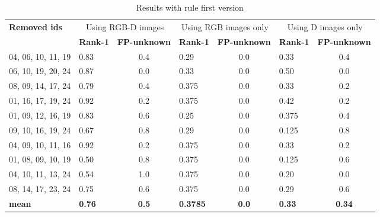 \documentclass{article}
\begin{document}
\begin{table}[]
	\begin{adjustwidth}{-.75in}{-.75in}
		\centering
		\caption{Results with rule first version}
		\label{tab:results-alpha}
		\begin{tabular}{|l|l|c|l|c|l|c|}
			\hline
			\multirow{2}{*}{\bf Removed ids} & \multicolumn{2}{c|}{Using RGB-D images} &\multicolumn{2}{c|}{Using RGB images only} &\multicolumn{2}{c|}{Using D images only} \\ \cline{2-7}
							 & \bf Rank-1 & \bf FP-unknown            & \bf Rank-1 & \bf FP-unknown              & \bf Rank-1 & \bf FP-unknown  \\ \hline
			04, 06, 10, 11, 19               & 0.83	      & 0.4                       & 0.29       & 0.0                         & 0.33       & 0.4\\ \hline
			06, 10, 19, 20, 24               & 0.87	      & 0.0                       & 0.33       & 0.0                         & 0.50       & 0.0\\ \hline
			08, 09, 14, 17, 24               & 0.79	      & 0.4                       & 0.375      & 0.0                         & 0.33       & 0.2\\ \hline
			01, 16, 17, 19, 24               & 0.92	      & 0.2                       & 0.375      & 0.0                         & 0.42       & 0.2\\ \hline
			01, 09, 12, 16, 19               & 0.83	      & 0.6                       & 0.25       & 0.0                         & 0.375      & 0.4\\ \hline
			09, 10, 16, 19, 24               & 0.67	      & 0.8                       & 0.29       & 0.0                         & 0.125      & 0.8\\ \hline
			04, 09, 10, 11, 16               & 0.92	      & 0.2                       & 0.375      & 0.0                         & 0.33       & 0.2\\ \hline
			01, 08, 09, 10, 19               & 0.50	      & 0.8                       & 0.375      & 0.0                         & 0.125      & 0.6\\ \hline
			04, 10, 11, 13, 24               & 0.54	      & 1.0                       & 0.375      & 0.0                         & 0.20       & 0.0\\ \hline
			08, 14, 17, 23, 24               & 0.75	      & 0.6                       & 0.375      & 0.0                         & 0.29       & 0.6\\ \hline
			\bf mean                         & \bf 0.76   & \bf 0.5                   & \bf 0.3785 & \bf 0.0                     & \bf 0.33   & \bf 0.34\\ \hline
		\end{tabular}
	\end{adjustwidth}
\end{table}
\end{document}

